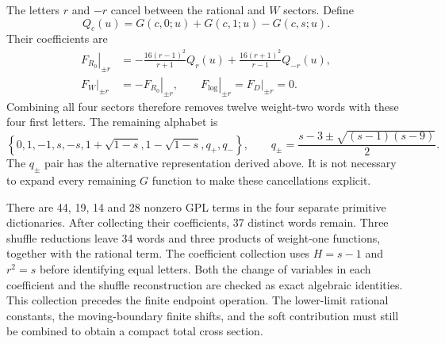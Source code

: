 The letters $r$ and $-r$ cancel between the rational and $W$ sectors.
Define
\begin{equation}
 Q_c(u)=G(c,0;u)+G(c,1;u)-G(c,s;u).
\end{equation}
Their coefficients are
\begin{align}
 \left.F_{R_0}\right|_{\pm r}
 &=-\frac{16(r-1)^2}{r+1}Q_r(u)
       +\frac{16(r+1)^2}{r-1}Q_{-r}(u),\\
 \left.F_W\right|_{\pm r}&=-\left.F_{R_0}\right|_{\pm r},
 \qquad \left.F_{\log}\right|_{\pm r}=\left.F_D\right|_{\pm r}=0.
\end{align}
Combining all four sectors therefore removes twelve weight-two words
with these four first letters. The remaining alphabet is
\begin{equation}
 \left\{0,1,-1,s,-s,1+\sqrt{1-s},1-\sqrt{1-s},q_+,q_-\right\},
 \qquad q_\pm=\frac{s-3\pm\sqrt{(s-1)(s-9)}}2.
\end{equation}
The $q_\pm$ pair has the alternative representation derived above.
It is not necessary to expand every remaining $G$ function to make
these cancellations explicit.

There are 44, 19, 14 and 28 nonzero GPL terms in the four separate
primitive dictionaries. After collecting their coefficients, 37 distinct
words remain. Three shuffle reductions leave 34 words and three products
of weight-one functions, together with the rational term. The coefficient
collection uses $H=s-1$ and $r^2=s$ before identifying equal letters.
Both the change of variables in each coefficient and the shuffle
reconstruction are checked as exact algebraic identities.
This collection precedes the finite endpoint operation. The lower-limit
rational constants, the moving-boundary finite shifts, and the soft
contribution must still be combined to obtain a compact total cross
section.

